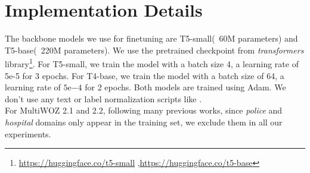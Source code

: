 \documentclass[11pt]{article}
\begin{document}
\clearpage
\renewcommand{\appendixpagename}{Supplementary Material}
\appendix
\appendixpage


\section{Implementation Details}
The backbone models we use for finetuning are T5-small(~60M  parameters) and T5-base(~220M parameters). We use the pretrained checkpoint from \textit{transformers}  library\footnote{\url{https://huggingface.co/t5-small}
,\url{https://huggingface.co/t5-base}}. For T5-small, we train the model with a batch size 4, a learning rate of 5e-5 for 3 epochs. For T4-base, we train the model with a batch size of 64, a learning rate of $5\mathrm{e}{-4}$ for 2 epochs. Both models are trained using Adam\cite{loshchilov2018decoupled}. We don't use any text or label normalization scripts like \cite{wu2019transferable,hosseini2020simple}.\\

For MultiWOZ 2.1 and 2.2, following many previous works\cite{wu2019transferable}, since \textit{police} and \textit{hospital} domains only appear in the training set, we exclude them in all our experiments.
\end{document}
